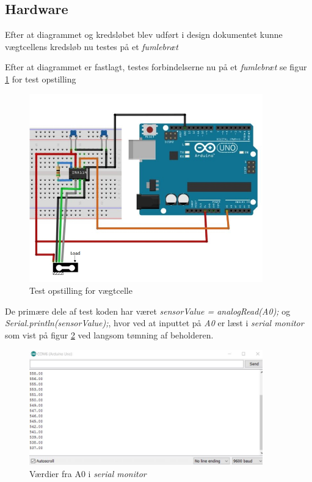 \subsection{Hardware}
Efter at diagrammet og kredsløbet blev udført i design dokumentet kunne vægtcellens kredsløb nu testes på et \textit{fumlebræt} 

Efter at diagrammet er fastlagt, testes forbindelserne nu på et \textit{fumlebræt} se figur \ref{fig:loadcelltest} for test opstilling

  \begin{figure}[H]
	\centering
	\includegraphics[width=0.9\textwidth]{billeder/Hardware/diagrammer/Drawing1.jpg}
	\caption{Test opstilling for vægtcelle}
	\label{fig:loadcelltest}
\end{figure}
De primære dele af test koden har været  \textit{sensorValue = analogRead(A0);} og \textit{Serial.println(sensorValue);}, hvor ved at inputtet på \textit{A0} er læst i \textit{serial monitor} som vist på figur \ref{fig:loadcell_test} ved langsom tømning af beholderen.

\begin{figure}[H]
	\centering
	\includegraphics[width=0.9\textwidth]{billeder/Hardware/diagrammer/loadcellunittestbits.JPG}
	\caption{Værdier fra A0 i \textit{serial monitor}}
	\label{fig:loadcell_test}
\end{figure}

